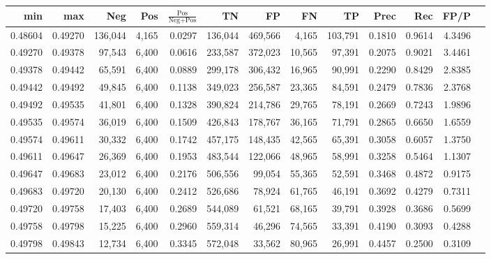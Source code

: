 \begin{tabular}{rrrrrrrrrrrrr}
\toprule
    min &     max &     Neg &   Pos & $\frac{\text{Pos}}{\text{Neg}+\text{Pos}}$ &      TN &      FP &      FN &      TP &   Prec &    Rec &   FP/P \\
\midrule
0.48604 & 0.49270 & 136,044 & 4,165 &                                     0.0297 & 136,044 & 469,566 &   4,165 & 103,791 & 0.1810 & 0.9614 & 4.3496 \\
0.49270 & 0.49378 &  97,543 & 6,400 &                                     0.0616 & 233,587 & 372,023 &  10,565 &  97,391 & 0.2075 & 0.9021 & 3.4461 \\
0.49378 & 0.49442 &  65,591 & 6,400 &                                     0.0889 & 299,178 & 306,432 &  16,965 &  90,991 & 0.2290 & 0.8429 & 2.8385 \\
0.49442 & 0.49492 &  49,845 & 6,400 &                                     0.1138 & 349,023 & 256,587 &  23,365 &  84,591 & 0.2479 & 0.7836 & 2.3768 \\
0.49492 & 0.49535 &  41,801 & 6,400 &                                     0.1328 & 390,824 & 214,786 &  29,765 &  78,191 & 0.2669 & 0.7243 & 1.9896 \\
0.49535 & 0.49574 &  36,019 & 6,400 &                                     0.1509 & 426,843 & 178,767 &  36,165 &  71,791 & 0.2865 & 0.6650 & 1.6559 \\
0.49574 & 0.49611 &  30,332 & 6,400 &                                     0.1742 & 457,175 & 148,435 &  42,565 &  65,391 & 0.3058 & 0.6057 & 1.3750 \\
0.49611 & 0.49647 &  26,369 & 6,400 &                                     0.1953 & 483,544 & 122,066 &  48,965 &  58,991 & 0.3258 & 0.5464 & 1.1307 \\
0.49647 & 0.49683 &  23,012 & 6,400 &                                     0.2176 & 506,556 &  99,054 &  55,365 &  52,591 & 0.3468 & 0.4872 & 0.9175 \\
0.49683 & 0.49720 &  20,130 & 6,400 &                                     0.2412 & 526,686 &  78,924 &  61,765 &  46,191 & 0.3692 & 0.4279 & 0.7311 \\
0.49720 & 0.49758 &  17,403 & 6,400 &                                     0.2689 & 544,089 &  61,521 &  68,165 &  39,791 & 0.3928 & 0.3686 & 0.5699 \\
0.49758 & 0.49798 &  15,225 & 6,400 &                                     0.2960 & 559,314 &  46,296 &  74,565 &  33,391 & 0.4190 & 0.3093 & 0.4288 \\
0.49798 & 0.49843 &  12,734 & 6,400 &                                     0.3345 & 572,048 &  33,562 &  80,965 &  26,991 & 0.4457 & 0.2500 & 0.3109 \\

\end{tabular}
